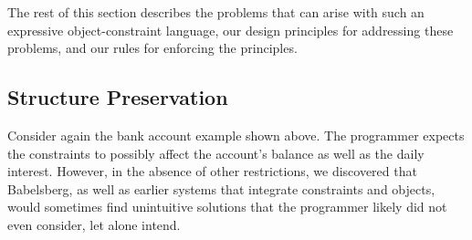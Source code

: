 \documentclass[10pt,reprint]{sigplanconf-preprint}
\begin{document}
The rest of this section describes the problems that can arise with
such an expressive object-constraint language, our design principles
for addressing these problems, and our rules for enforcing the
principles.



\subsection{Structure Preservation}
\label{sec:object-structure}

Consider again the bank account example shown above.  The programmer
expects the constraints to possibly affect the
account's balance as well as the daily interest.  However, in the
absence of other restrictions, we discovered that Babelsberg, as well
as earlier systems that integrate constraints and objects, would
sometimes find unintuitive solutions that the programmer likely did not
even consider, let alone intend. 
\end{document}
